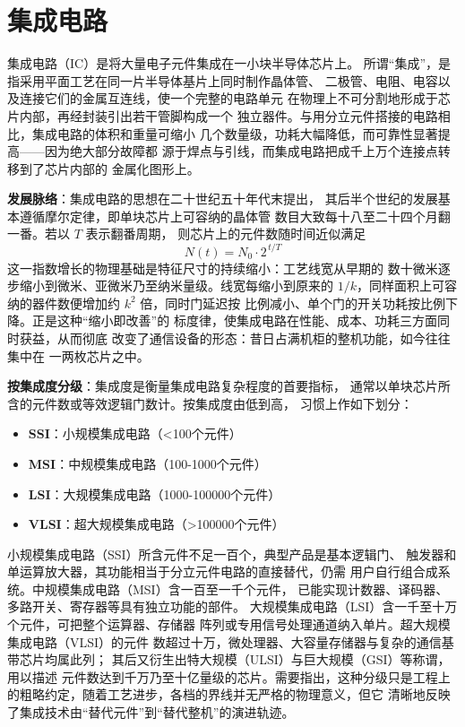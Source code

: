 
\section{集成电路}
\label{sec:integrated_circuits}

集成电路（IC）是将大量电子元件集成在一小块半导体芯片上。
所谓“集成”，是指采用平面工艺在同一片半导体基片上同时制作晶体管、
二极管、电阻、电容以及连接它们的金属互连线，使一个完整的电路单元
在物理上不可分割地形成于芯片内部，再经封装引出若干管脚构成一个
独立器件。与用分立元件搭接的电路相比，集成电路的体积和重量可缩小
几个数量级，功耗大幅降低，而可靠性显著提高——因为绝大部分故障都
源于焊点与引线，而集成电路把成千上万个连接点转移到了芯片内部的
金属化图形上。

\textbf{发展脉络}：集成电路的思想在二十世纪五十年代末提出，
其后半个世纪的发展基本遵循摩尔定律，即单块芯片上可容纳的晶体管
数目大致每十八至二十四个月翻一番。若以 $T$ 表示翻番周期，
则芯片上的元件数随时间近似满足
\[
N(t) = N_0 \cdot 2^{\,t/T}
\]
这一指数增长的物理基础是特征尺寸的持续缩小：工艺线宽从早期的
数十微米逐步缩小到微米、亚微米乃至纳米量级。线宽每缩小到原来的
$1/k$，同样面积上可容纳的器件数便增加约 $k^2$ 倍，同时门延迟按
比例减小、单个门的开关功耗按比例下降。正是这种“缩小即改善”的
标度律，使集成电路在性能、成本、功耗三方面同时获益，从而彻底
改变了通信设备的形态：昔日占满机柜的整机功能，如今往往集中在
一两枚芯片之中。

\textbf{按集成度分级}：集成度是衡量集成电路复杂程度的首要指标，
通常以单块芯片所含的元件数或等效逻辑门数计。按集成度由低到高，
习惯上作如下划分：

\begin{itemize}
    \item \textbf{SSI}：小规模集成电路（<100个元件）
    \item \textbf{MSI}：中规模集成电路（100-1000个元件）
    \item \textbf{LSI}：大规模集成电路（1000-100000个元件）
    \item \textbf{VLSI}：超大规模集成电路（>100000个元件）
\end{itemize}

小规模集成电路（SSI）所含元件不足一百个，典型产品是基本逻辑门、
触发器和单运算放大器，其功能相当于分立元件电路的直接替代，仍需
用户自行组合成系统。中规模集成电路（MSI）含一百至一千个元件，
已能实现计数器、译码器、多路开关、寄存器等具有独立功能的部件。
大规模集成电路（LSI）含一千至十万个元件，可把整个运算器、存储器
阵列或专用信号处理通道纳入单片。超大规模集成电路（VLSI）的元件
数超过十万，微处理器、大容量存储器与复杂的通信基带芯片均属此列；
其后又衍生出特大规模（ULSI）与巨大规模（GSI）等称谓，用以描述
元件数达到千万乃至十亿量级的芯片。需要指出，这种分级只是工程上
的粗略约定，随着工艺进步，各档的界线并无严格的物理意义，但它
清晰地反映了集成技术由“替代元件”到“替代整机”的演进轨迹。

